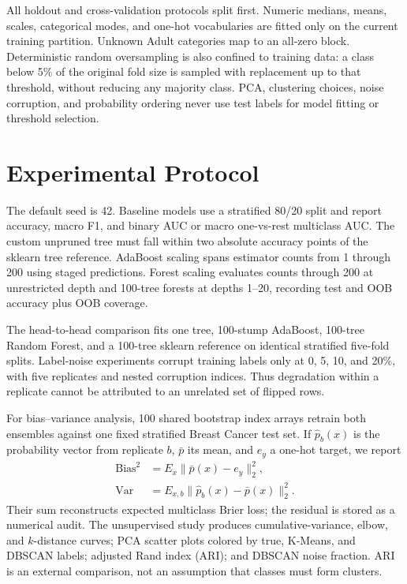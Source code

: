 \documentclass[conference]{IEEEtran}
\begin{document}
All holdout and cross-validation protocols split first. Numeric medians,
means, scales, categorical modes, and one-hot vocabularies are fitted only on
the current training partition. Unknown Adult categories map to an all-zero
block. Deterministic random oversampling is also confined to training data: a
class below 5\% of the original fold size is sampled with replacement up to
that threshold, without reducing any majority class. PCA, clustering choices,
noise corruption, and probability ordering never use test labels for model
fitting or threshold selection.

\section{Experimental Protocol}
The default seed is 42. Baseline models use a stratified 80/20 split and report
accuracy, macro F1, and binary AUC or macro one-vs-rest multiclass AUC. The
custom unpruned tree must fall within two absolute accuracy points of the
sklearn tree reference. AdaBoost scaling spans estimator counts from 1 through
200 using staged predictions. Forest scaling evaluates counts through 200 at
unrestricted depth and 100-tree forests at depths 1--20, recording test and OOB
accuracy plus OOB coverage.

The head-to-head comparison fits one tree, 100-stump AdaBoost, 100-tree Random
Forest, and a 100-tree sklearn reference on identical stratified five-fold
splits. Label-noise experiments corrupt training labels only at 0, 5, 10, and
20\%, with five replicates and nested corruption indices. Thus degradation
within a replicate cannot be attributed to an unrelated set of flipped rows.

For bias--variance analysis, 100 shared bootstrap index arrays retrain both
ensembles against one fixed stratified Breast Cancer test set. If
$\hat p_b(x)$ is the probability vector from replicate $b$, $\bar p$ its mean,
and $e_y$ a one-hot target, we report
\begin{align}
\text{Bias}^2 &= E_x\|\bar p(x)-e_y\|_2^2,\\
\text{Var} &= E_{x,b}\|\hat p_b(x)-\bar p(x)\|_2^2. \label{eq:brier}
\end{align}
Their sum reconstructs expected multiclass Brier loss; the residual is stored
as a numerical audit. The unsupervised study produces cumulative-variance,
elbow, and $k$-distance curves; PCA scatter plots colored by true, K-Means, and
DBSCAN labels; adjusted Rand index (ARI); and DBSCAN noise fraction. ARI is an
external comparison, not an assumption that classes must form clusters.
\end{document}
